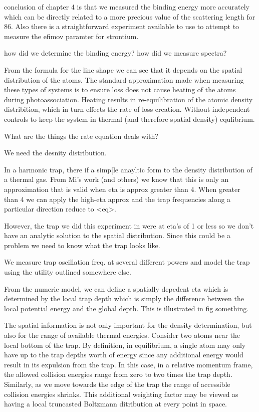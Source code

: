 conclusion of chapter 4 is that we measured the binding energy more accurately which can be directly related to a more precious value of the scattering length for 86. Also there is a straightforward experiment available to use to attempt to measure the efimov paramter for strontium.

how did we determine the binding energy? how did we measure spectra?



From the formula for the line shape we can see that it depends on the spatial distribution of the atoms. The standard approximation made when measuring these types of systems is to ensure loss does not cause heating of the atoms during photoassociation. Heating results in re-equilibration of the atomic density distribition, which in turn effects the rate of loss creation. Without independent controls to keep the system in thermal (and therefore spatial density) equlibrium.

What are the things the rate equation deals with?

We need the desnity distribution.

In a harmonic trap, there if a simp[le anayltic form to the density distribution of a thermal gas. From Mi's work (and others) we know that this is only an approximation that is valid when eta is approx greater than 4. When greater than 4 we can apply the high-eta approx and the trap frequencies along a particular direction reduce to <eq>.

However, the trap we did this experiment in were at eta's of 1 or less so we don't have an analytic solution to the spatial distribution. Since this could be a problem we need to know what the trap looks like.

We measure trap oscillation freq. at several different powers and model the trap using the utility outlined somewhere else.

From the numeric model, we can define a spatially depedent eta which is determined by the local trap depth which is simply the difference between the local potential energy and the global depth. This is illustrated in fig something.

The spatial information is not only important for the density determination, but also for the range of available thermal energies. Consider two atoms near the local bottom of the trap. By definition, in equilibrium, a single atom may only have up to the trap depths worth of energy since any additional energy would result in its expulsion from the trap. In this case, in a relative momentum frame, the allowed collision energies range from zero to two times the trap depth. Similarly, as we move towards the edge of the trap the range of accessible collision energies shrinks. This additional weighting factor may be viewed as having a local truncasted Boltzmann ditribution at every point in space. 

